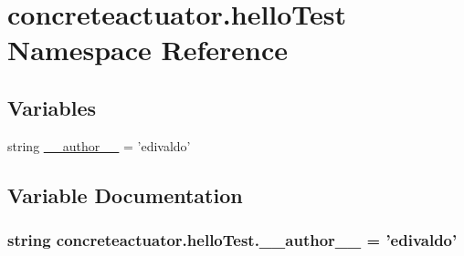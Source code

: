 \hypertarget{namespaceconcreteactuator_1_1helloTest}{}\section{concreteactuator.\+hello\+Test Namespace Reference}
\label{namespaceconcreteactuator_1_1helloTest}
\subsection*{Variables}
\begin{DoxyCompactItemize}
\item 
string \hyperlink{namespaceconcreteactuator_1_1helloTest_aeaa25ad323b2174508ba30e8d4299cda}{\+\_\+\+\_\+author\+\_\+\+\_\+} = 'edivaldo'
\end{DoxyCompactItemize}


\subsection{Variable Documentation}
\hypertarget{namespaceconcreteactuator_1_1helloTest_aeaa25ad323b2174508ba30e8d4299cda}{}
\subsubsection[{\+\_\+\+\_\+author\+\_\+\+\_\+}]{\setlength{\rightskip}{0pt plus 5cm}string concreteactuator.\+hello\+Test.\+\_\+\+\_\+author\+\_\+\+\_\+ = 'edivaldo'}\label{namespaceconcreteactuator_1_1helloTest_aeaa25ad323b2174508ba30e8d4299cda}
